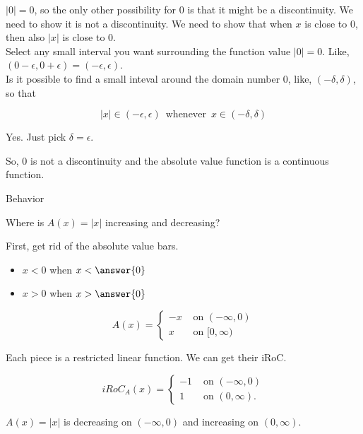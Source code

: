 \documentclass{ximera}
\begin{document}
$| 0 | = 0$, so the only other possibility for $0$ is that it might be a discontinuity.  We need to show it is not a discontinuity.  We need to show that when $x$ is close to $0$, then also $| x |$ is close to $0$. \\

Select any small interval you want surrounding the function value $| 0 | = 0$.  Like, $(0 - \epsilon, 0 + \epsilon) = (-\epsilon, \epsilon)$. \\



Is it possible to find a small inteval around the domain number $0$, like, $(-\delta, \delta)$, so that



\[
| x | \in (-\epsilon, \epsilon) \, \text{ whenever } \, x \in (-\delta, \delta)
\]


Yes.  Just pick $\delta = \epsilon$.

So, $0$ is not a discontinuity and the absolute value function is a continuous function.










\begin{example}  Behavior


Where is $A(x) = | x |$ increasing and decreasing?



\begin{explanation}


First, get rid of the absolute value bars.

\begin{itemize}
\item $x < 0$ when $x < \answer{0}$
\item $x > 0$ when $x > \answer{0}$
\end{itemize}



\[
A(x) = 
\begin{cases}
  -x & \text{ on } (-\infty, 0)   \\
  x  & \text{ on } [0, \infty)
\end{cases}
\]



Each piece is a restricted linear function.  We can get their iRoC.


\[
iRoC_A(x) = 
\begin{cases}
  -1 & \text{ on } (-\infty, 0)   \\
  1  & \text{ on } (0, \infty).
\end{cases}
\]


$A(x) = | x |$ is decreasing on $(-\infty, 0)$ and increasing on $(0, \infty)$.



\end{explanation}


\end{example}
\end{document}
